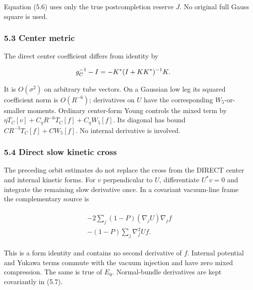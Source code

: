 Equation (5.6) uses only the true postcompletion reserve \(J\). No
original full Gauss square is used.

\subsubsection{5.3 Center metric}\label{i-center-metric}

The direct center coefficient differs from identity by

\begin{gather*}
\begin{aligned}
& g_{C}^{-1}-I=-K^{*}(I+KK^{*})^{-1}K.
\end{aligned}\notag
\end{gather*}

It is \(O(\sigma ^{2})\) on arbitrary tube vectors. On a Gaussian low
leg its squared coefficient norm is \(O(R^{-6})\); derivatives on \(U\)
have the corresponding \(W_{5}\)-or-smaller moments. Ordinary
center-form Young controls the mixed term by
\(\eta  T_{C}[v]+C_{\eta} R^{-6}T_{C}[f]+C_{\eta}W_{5}[f]\). Its
diagonal has bound \(C R^{-3}T_{C}[f]+CW_{5}[f]\). No internal
derivative is involved.

\subsubsection{5.4 Direct slow kinetic
cross}\label{i-direct-slow-kinetic-cross}

The preceding orbit estimates do not replace the cross from the DIRECT
center and internal kinetic forms. For \(v\) perpendicular to \(U\),
differentiate \(U^{*}v=0\) and integrate the remaining slow derivative
once. In a covariant vacuum-line frame the complementary source is

\begin{gather*}
\begin{aligned}
& -2 \sum _{j} (1-P)(\nabla _{j} U) \nabla _{j} f \\
& -(1-P)\sum _{j} \nabla _{j}^{2} U f.
\end{aligned}\tag{5.7}
\end{gather*}

This is a form identity and contains no second derivative of \(f\).
Internal potential and Yukawa terms commute with the vacuum injection
and have zero mixed compression. The same is true of \(E_{0}\).
Normal-bundle derivatives are kept covariantly in (5.7).

